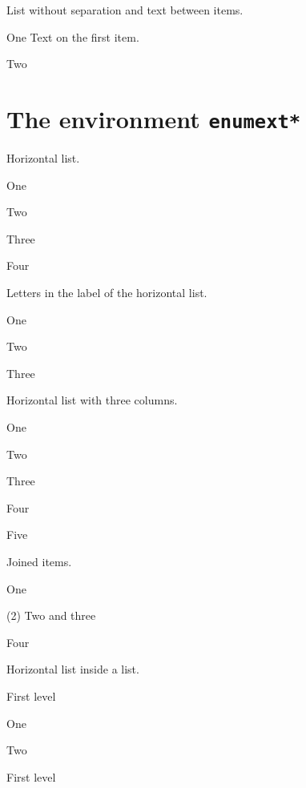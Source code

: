 \documentclass{article}
\begin{document}
List without separation and text between items.

\begin{enumext}[nosep]
  \item One
    Text on the first item.
  \item Two
\end{enumext}

\section{The environment \texttt{enumext*}}

Horizontal list.

\begin{enumext*}
  \item One
  \item Two
  \item Three
  \item Four
\end{enumext*}

Letters in the label of the horizontal list.

\begin{enumext*}[label=\alph*)]
  \item One
  \item Two
  \item Three
\end{enumext*}

Horizontal list with three columns.

\begin{enumext*}[columns=3]
  \item One
  \item Two
  \item Three
  \item Four
  \item Five
\end{enumext*}

Joined items.

\begin{enumext*}[columns=3]
  \item One
  \item(2) Two and three
  \item Four
\end{enumext*}

Horizontal list inside a list.

\begin{enumext}
  \item First level
    \begin{enumext*}
      \item One
      \item Two
    \end{enumext*}
  \item First level
\end{enumext}
\end{document}
